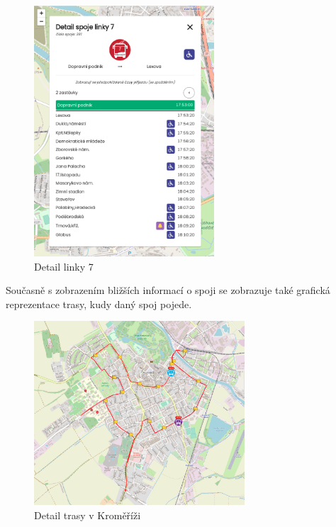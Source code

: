 \begin{figure}[H]
    \centering
    \includegraphics[width=0.6\textwidth]{images/global_pce_con_detail_7.png}
    \caption{Detail linky 7}
    \label{detal7}
\end{figure}

Současně s zobrazením bližších informací o spoji se zobrazuje také grafická reprezentace trasy, kudy daný spoj pojede.

\begin{figure}[H]
    \centering
    \includegraphics[width=0.7\textwidth]{images/krom_line_6.png}
    \caption{Detail trasy v Kroměříži}
    \label{trasa}
\end{figure}

